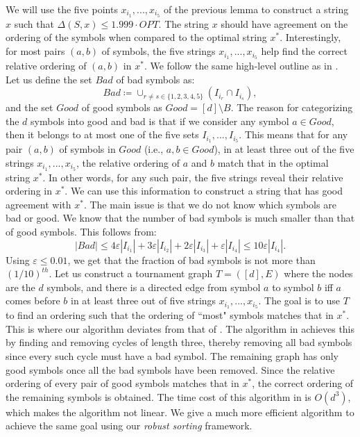 \documentclass[11pt]{llncs}
\newcommand{\veps}{\varepsilon}
\begin{document}
We will use the five points $x_{i_1}, ..., x_{i_5}$ of the previous lemma to construct a string $x$ such that $\Delta(S, x) \leq 1.999 \cdot OPT$. 
The string $x$ should have agreement on the ordering of the symbols when compared to the optimal string $x^*$. Interestingly, for most pairs $(a, b)$ of symbols, the five strings $x_{i_1}, ..., x_{i_5}$ help find the correct relative ordering of $(a, b)$ in $x^*$. We follow the same high-level outline as in \cite{cdk23}.
Let us define the set $Bad$ of bad symbols as:
$$
Bad \coloneqq \cup_{r \neq s \in \{1, 2, 3, 4, 5\}}{(I_{i_r} \cap I_{i_s})},
$$
and the set $Good$ of good symbols as $Good = [d] \setminus B$. The reason for categorizing the $d$ symbols into good and bad is that if we consider any symbol $a \in Good$, then it belongs to at most one of the five sets $I_{i_1}, ..., I_{i_5}$. This means that for any pair $(a, b)$ of symbols in $Good$ (i.e., $a, b \in Good$), in at least three out of the five strings $x_{i_1}, ..., x_{i_5}$, the relative ordering of $a$ and $b$ match that in the optimal string $x^*$. In other words, for any such pair, the five strings reveal their relative ordering in $x^*$. We can use this information to construct a string that has good agreement with $x^*$. 
The main issue is that we do not know which symbols are bad or good. 
We know that the number of bad symbols is much smaller than that of good symbols. This follows from:
$$
|Bad| \leq 4 \veps |I_{i_1}| + 3 \veps |I_{i_2}| + 2 \veps |I_{i_3}| + \veps |I_{i_4}| \leq 10 \veps |I_{i_4}|.
$$
Using $\veps \leq 0.01$, we get that the fraction of bad symbols is not more than $(1/10)^{th}$.
Let us construct a tournament graph $T = ([d], E)$ where the nodes are the $d$ symbols, and there is a directed edge from symbol $a$ to symbol $b$ iff $a$ comes before $b$ in at least three out of five strings $x_{i_1}, ..., x_{i_5}$. The goal is to use $T$ to find an ordering such that the ordering of ``most" symbols matches that in $x^*$. This is where our algorithm deviates from that of \cite{cdk23}. 
The algorithm in \cite{cdk23} achieves this by finding and removing cycles of length three, thereby removing all bad symbols since every such cycle must have a bad symbol. The remaining graph has only good symbols once all the bad symbols have been removed. Since the relative ordering of every pair of good symbols matches that in $x^*$, the correct ordering of the remaining symbols is obtained. The time cost of this algorithm in \cite{cdk23} is $O(d^3)$, which makes the algorithm not linear. We give a much more efficient algorithm to achieve the same goal using our {\em robust sorting} framework. 
\end{document}
